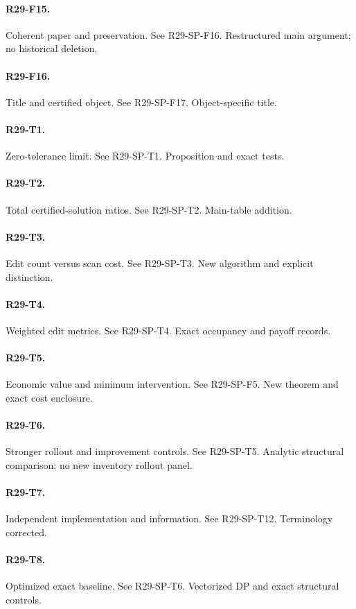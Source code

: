 \paragraph{R29-F15.} Coherent paper and preservation. See R29-SP-F16. Restructured main argument; no historical deletion.
\paragraph{R29-F16.} Title and certified object. See R29-SP-F17. Object-specific title.
\paragraph{R29-T1.} Zero-tolerance limit. See R29-SP-T1. Proposition and exact tests.
\paragraph{R29-T2.} Total certified-solution ratios. See R29-SP-T2. Main-table addition.
\paragraph{R29-T3.} Edit count versus scan cost. See R29-SP-T3. New algorithm and explicit distinction.
\paragraph{R29-T4.} Weighted edit metrics. See R29-SP-T4. Exact occupancy and payoff records.
\paragraph{R29-T5.} Economic value and minimum intervention. See R29-SP-F5. New theorem and exact cost enclosure.
\paragraph{R29-T6.} Stronger rollout and improvement controls. See R29-SP-T5. Analytic structural comparison; no new inventory rollout panel.
\paragraph{R29-T7.} Independent implementation and information. See R29-SP-T12. Terminology corrected.
\paragraph{R29-T8.} Optimized exact baseline. See R29-SP-T6. Vectorized DP and exact structural controls.
